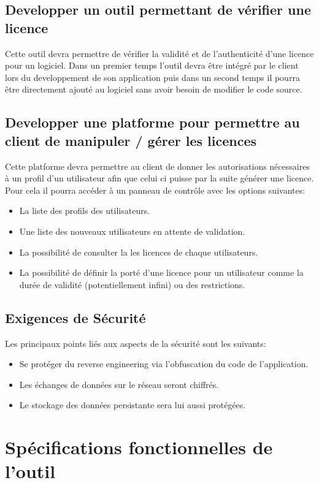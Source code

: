 \section{Developper un outil permettant de vérifier une licence}
Cette outil devra permettre de vérifier la validité et de l'authenticité d'une licence pour un logiciel. \newline
Dans un premier temps l'outil devra être intégré par le client lors du developpement de son application 
puis dans un second temps il pourra être directement ajouté au logiciel sans avoir besoin de modifier le 
code source.

\section{Developper une platforme pour permettre au client de manipuler / gérer les licences}
Cette platforme devra permettre au client de donner les autorisations nécessaires à un profil d'un utilisateur afin que celui ci puisse par la suite générer une licence. Pour cela il pourra accéder à un panneau de contrôle avec les options suivantes:
\begin{itemize}
	\item La liste des profils des utilisateurs.
	\item Une liste des nouveaux utilisateurs en attente de validation.
	\item La possibilité de consulter la les licences de chaque utilisateurs.
	\item La possibilité de définir la porté d'une licence pour un utilisateur 
		  comme la durée de validité (potentiellement infini) ou des restrictions.
\end{itemize}
\newpage

\section{Exigences de Sécurité}
Les principaux points liés aux aspects de la sécurité sont les suivants:
\begin{itemize}
	\item Se protéger du reverse engineering via l'obfuscation du code de l'application.
	\item Les échanges de données sur le réseau seront chiffrés.
	\item Le stockage des données persistante sera lui aussi protégées.
\end{itemize}   

\chapter{Spécifications fonctionnelles de l'outil}

